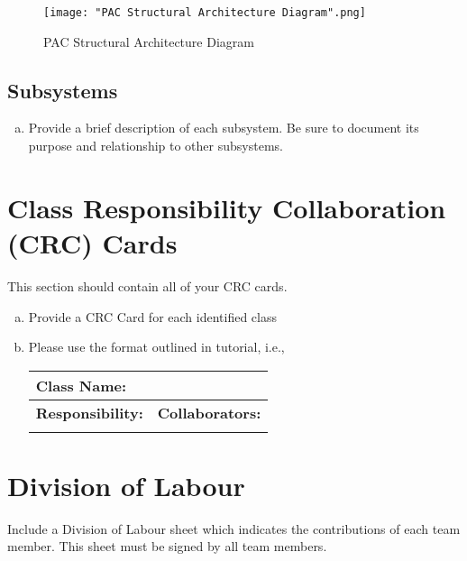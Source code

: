 \documentclass[]{article}
\begin{document}
\begin{figure}[H]
    \centering
    \texttt{[image: "PAC Structural Architecture Diagram".png]}
    \caption{PAC Structural Architecture Diagram}
\end{figure}

\subsection{Subsystems}
\label{sub:subsystems}
\begin{enumerate}[a)]
	\item Provide a brief description of each subsystem. Be sure to document its purpose and relationship to other subsystems.
\end{enumerate}

	
\section{Class Responsibility Collaboration (CRC) Cards}
\label{sec:class_responsibility_collaboration_crc_cards}
This section should contain all of your CRC cards.

\begin{enumerate}[a)]
	\item Provide a CRC Card for each identified class
	\item Please use the format outlined in tutorial, i.e., 
	\begin{table}[ht]
		\centering
		\begin{tabular}{|p{5cm}|p{5cm}|}
		\hline 
		 \multicolumn{2}{|l|}{\textbf{Class Name:}} \\
		\hline
		\textbf{Responsibility:} & \textbf{Collaborators:} \\
		\hline
		\vspace{1in} & \\
		\hline
		\end{tabular}
	\end{table}
	
\end{enumerate}

\appendix
\section{Division of Labour}
\label{sec:division_of_labour}
Include a Division of Labour sheet which indicates the contributions of each team member. This sheet must be signed by all team members.
\end{document}
